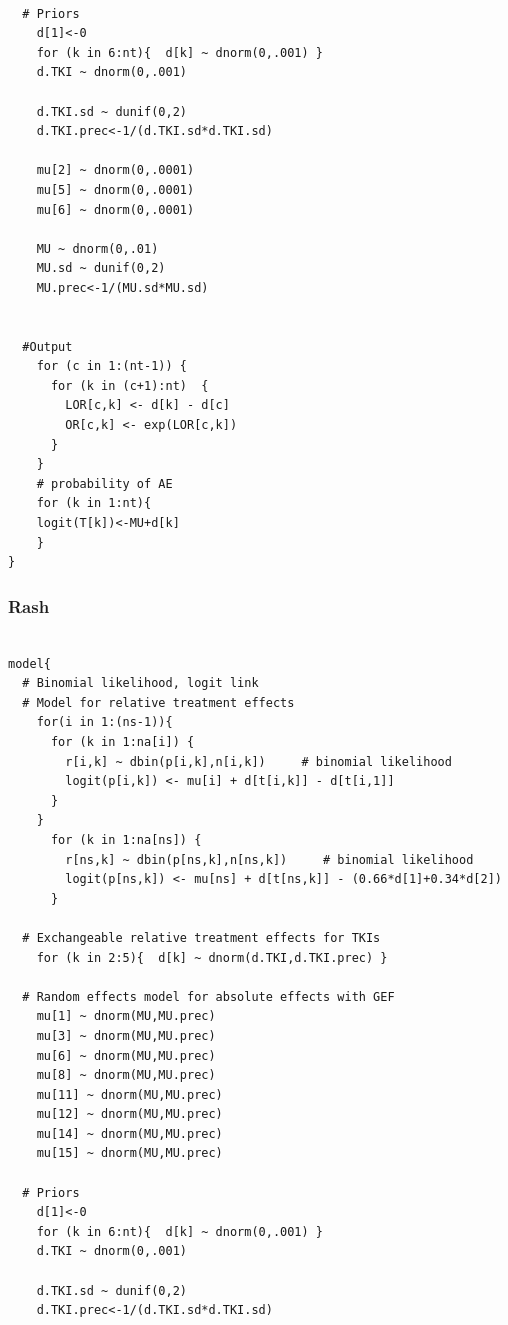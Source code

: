 \documentclass[11pt,final,fleqn]{article}\usepackage[]{graphicx}\usepackage[]{color}
\theoremstyle{plain}
\begin{document}
\begin{appendices}
\begin{verbatim}
       
  # Priors
    d[1]<-0                                      
    for (k in 6:nt){  d[k] ~ dnorm(0,.001) }     
    d.TKI ~ dnorm(0,.001)
    
    d.TKI.sd ~ dunif(0,2) 
    d.TKI.prec<-1/(d.TKI.sd*d.TKI.sd)
    
    mu[2] ~ dnorm(0,.0001)                     
    mu[5] ~ dnorm(0,.0001)                       
    mu[6] ~ dnorm(0,.0001)                       
      
    MU ~ dnorm(0,.01)                         
    MU.sd ~ dunif(0,2) 
    MU.prec<-1/(MU.sd*MU.sd)
    
      
  #Output                                       
    for (c in 1:(nt-1)) {                        
      for (k in (c+1):nt)  { 
        LOR[c,k] <- d[k] - d[c]
        OR[c,k] <- exp(LOR[c,k])
      }  
    }
    # probability of AE
    for (k in 1:nt){ 
    logit(T[k])<-MU+d[k]
    }
}

\end{verbatim}

\subsubsection{Rash} 
\begin{verbatim} 

model{
  # Binomial likelihood, logit link
  # Model for relative treatment effects
    for(i in 1:(ns-1)){                  
      for (k in 1:na[i]) {               
        r[i,k] ~ dbin(p[i,k],n[i,k])     # binomial likelihood
        logit(p[i,k]) <- mu[i] + d[t[i,k]] - d[t[i,1]]  
      }
    }   
      for (k in 1:na[ns]) {               
        r[ns,k] ~ dbin(p[ns,k],n[ns,k])     # binomial likelihood
        logit(p[ns,k]) <- mu[ns] + d[t[ns,k]] - (0.66*d[1]+0.34*d[2])  
      }
  
  # Exchangeable relative treatment effects for TKIs
    for (k in 2:5){  d[k] ~ dnorm(d.TKI,d.TKI.prec) }
  
  # Random effects model for absolute effects with GEF
    mu[1] ~ dnorm(MU,MU.prec)
    mu[3] ~ dnorm(MU,MU.prec)
    mu[6] ~ dnorm(MU,MU.prec) 
    mu[8] ~ dnorm(MU,MU.prec) 
    mu[11] ~ dnorm(MU,MU.prec) 
    mu[12] ~ dnorm(MU,MU.prec) 
    mu[14] ~ dnorm(MU,MU.prec)
    mu[15] ~ dnorm(MU,MU.prec)
       
  # Priors
    d[1]<-0                                      
    for (k in 6:nt){  d[k] ~ dnorm(0,.001) }     
    d.TKI ~ dnorm(0,.001)
    
    d.TKI.sd ~ dunif(0,2) 
    d.TKI.prec<-1/(d.TKI.sd*d.TKI.sd)
    

\end{verbatim}
\end{appendices}
\end{document}
